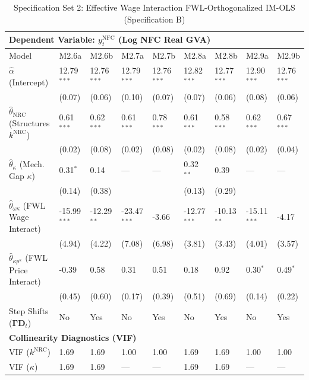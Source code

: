 \begin{table}[H]
\centering
\setlength{\tabcolsep}{2.5pt}
\caption{Specification Set 2: Effective Wage Interaction FWL-Orthogonalized IM-OLS (Specification B)}
\label{tab:specB_set2}
\scriptsize
\begin{tabular}{p{3.8cm}p{1.1cm}p{1.1cm}p{1.1cm}p{1.1cm}p{1.1cm}p{1.1cm}p{1.1cm}p{1.1cm}}
\toprule
\multicolumn{9}{l}{\textbf{Dependent Variable: $y_t^{\text{NFC}}$ (Log NFC Real GVA)}} \\
\midrule
Model & M2.6a & M2.6b & M2.7a & M2.7b & M2.8a & M2.8b & M2.9a & M2.9b \\
\midrule
$\hat{\alpha}$ (Intercept) & 12.79$^{***}$ & 12.76$^{***}$ & 12.79$^{***}$ & 12.76$^{***}$ & 12.82$^{***}$ & 12.77$^{***}$ & 12.90$^{***}$ & 12.76$^{***}$ \\
 & (0.07) & (0.06) & (0.10) & (0.07) & (0.07) & (0.06) & (0.08) & (0.06) \\
$\hat{\theta}_{\text{NRC}}$ (Structures $k^{\text{NRC}}$) & 0.61$^{***}$ & 0.62$^{***}$ & 0.61$^{***}$ & 0.78$^{***}$ & 0.61$^{***}$ & 0.58$^{***}$ & 0.62$^{***}$ & 0.67$^{***}$ \\
 & (0.02) & (0.08) & (0.02) & (0.08) & (0.02) & (0.08) & (0.02) & (0.04) \\
$\hat{\theta}_{\kappa}$ (Mech. Gap $\kappa$) & 0.31$^{*}$ & 0.14 & --- & --- & 0.32$^{**}$ & 0.39 & --- & --- \\
 & (0.14) & (0.38) &  &  & (0.13) & (0.29) &  &  \\
$\hat{\theta}_{\omega\kappa}$ (FWL Wage Interact) & -15.99$^{***}$ & -12.29$^{**}$ & -23.47$^{***}$ & -3.66 & -12.77$^{***}$ & -10.13$^{**}$ & -15.11$^{***}$ & -4.17 \\
 & (4.94) & (4.22) & (7.08) & (6.98) & (3.81) & (3.43) & (4.01) & (3.57) \\
$\hat{\theta}_{\kappa p^{\kappa}}$ (FWL Price Interact) & -0.39 & 0.58 & 0.31 & 0.51 & 0.18 & 0.92 & 0.30$^{*}$ & 0.49$^{*}$ \\
 & (0.45) & (0.60) & (0.17) & (0.39) & (0.51) & (0.69) & (0.14) & (0.22) \\
Step Shifts ($\boldsymbol{\Gamma} \mathbf{D}_t$) & No & Yes & No & Yes & No & Yes & No & Yes \\
\midrule
\multicolumn{9}{l}{\textbf{Collinearity Diagnostics (VIF)}} \\
VIF ($k^{\text{NRC}}$) & 1.69 & 1.69 & 1.00 & 1.00 & 1.69 & 1.69 & 1.00 & 1.00 \\
VIF ($\kappa$) & 1.69 & 1.69 & --- & --- & 1.69 & 1.69 & --- & --- \\

\end{tabular}
\end{table}
